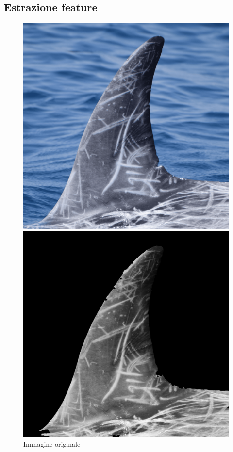 \documentclass[a4paper,12pt]{report}
\begin{document}
    \subsection{Estrazione feature}
    \begin{figure}[H]
      
      \centering
      \begin{minipage}{0.3\textwidth}
        \centering
        \includegraphics[width=\textwidth]{assets/images/methods/porting/features_extraction/original.png}   
        \caption{Immagine originale}
      \end{minipage}
      \begin{minipage}{0.3\textwidth}
        \centering
        \includegraphics[width=\textwidth]{assets/images/methods/porting/features_extraction/gray.png}  

\end{minipage}
\end{figure}
\end{document}
